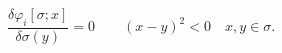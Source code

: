 \begin{equation}	\label{12.35}
\frac{\delta\varphi_i[\sigma;x]}{\delta\sigma(y)} = 0
\qquad
(x-y)^2 < 0  \quad x,y\in\sigma .
	\end{equation}

